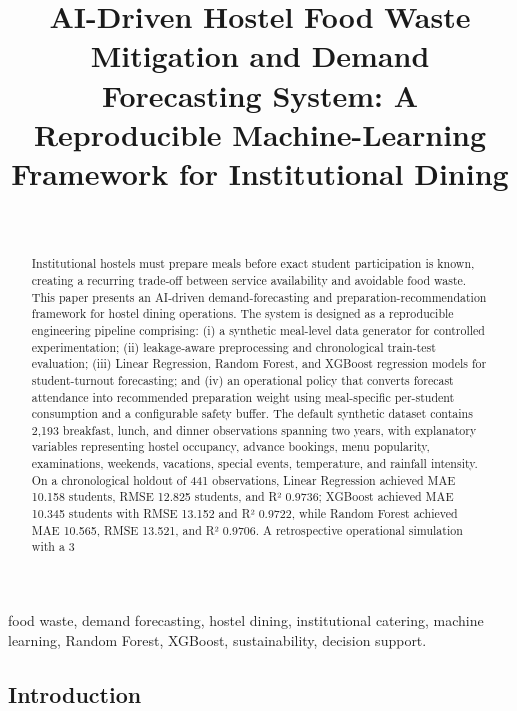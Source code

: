 \documentclass[conference]{IEEEtran}
\title{AI-Driven Hostel Food Waste Mitigation and Demand Forecasting
System: A Reproducible Machine-Learning Framework for Institutional
Dining}
\author{\IEEEauthorblockN{Author Name(s)}\\
\IEEEauthorblockA{Department / Institution\\City, Country\\email@example.com}}
\begin{document}
\maketitle
\begin{abstract}
Institutional hostels must prepare meals before exact student participation is known, creating a recurring trade-off between service availability and avoidable food waste. This paper presents an AI-driven demand-forecasting and preparation-recommendation framework for hostel dining operations. The system is designed as a reproducible engineering pipeline comprising: (i) a synthetic meal-level data generator for controlled experimentation; (ii) leakage-aware preprocessing and chronological train-test evaluation; (iii) Linear Regression, Random Forest, and XGBoost regression models for student-turnout forecasting; and (iv) an operational policy that converts forecast attendance into recommended preparation weight using meal-specific per-student consumption and a configurable safety buffer. The default synthetic dataset contains 2,193 breakfast, lunch, and dinner observations spanning two years, with explanatory variables representing hostel occupancy, advance bookings, menu popularity, examinations, weekends, vacations, special events, temperature, and rainfall intensity. On a chronological holdout of 441 observations, Linear Regression achieved MAE 10.158 students, RMSE 12.825 students, and R² 0.9736; XGBoost achieved MAE 10.345 students with RMSE 13.152 and R² 0.9722, while Random Forest achieved MAE 10.565, RMSE 13.521, and R² 0.9706. A retrospective operational simulation with a 3%
\end{abstract}
\begin{IEEEkeywords}
food waste, demand forecasting, hostel dining, institutional catering, machine learning, Random Forest, XGBoost, sustainability, decision support.
\end{IEEEkeywords}

\subsection{Introduction}\label{introduction}
\end{document}
